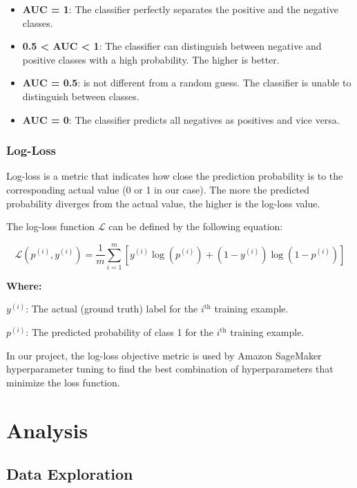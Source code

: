 \documentclass[a4paper]{article}
\begin{document}
{    \begin{itemize}
    \item \textbf{AUC = 1}: The classifier perfectly separates the positive and the negative classes.
    \item \textbf{0.5 < AUC < 1}: The classifier can distinguish between negative and positive classes with a high probability. The higher is better.
    \item \textbf{AUC = 0.5}: is not different from a random guess. The classifier is unable to distinguish between classes.
    \item \textbf{AUC = 0}: The classifier predicts all negatives as positives and vice versa.
    \end{itemize}

    \subsubsection{Log-Loss}
    \label{sec:log-loss}
    Log-loss is a metric that indicates how close the prediction probability is to the corresponding actual value (0 or 1 in our case). The more the predicted probability diverges from the actual value, the higher is the log-loss value.

    {
      The log-loss function $\mathcal{L}$ can be defined by the following equation:
      
      \newcommand{\yi}{y^{(i)}}
      \newcommand{\probi}{p^{(i)}}

      $$
      \mathcal{L}\left(\probi, \yi\right)
      = \frac{1}{m} \sum_{i=1}^m \left[\yi\log\left(\probi\right)
        + \left(1 - \yi\right) \log\left(1-\probi\right)
      \right]
      $$


      \textbf{Where:}

      $\yi$: The actual (ground truth) label for the $i^{\text{th}}$ training example.

      $\probi$: The predicted probability of class 1 for the $i^{\text{th}}$ training example.
      
    }

    In our project, the log-loss objective metric is used by Amazon SageMaker hyperparameter tuning to find the best combination of hyperparameters that minimize the loss function.


    \section{Analysis}
    \subsection{Data Exploration}
    \label{sec:data-exploration}

}
\end{document}
